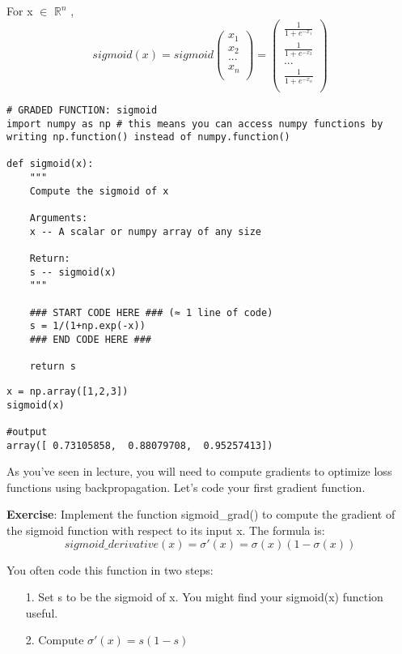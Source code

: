 For x $\in$ $\mathbb{R}^n$ ,
\begin{equation}
sigmoid(x) = sigmoid\begin{pmatrix}
    x_1  \\
    x_2  \\
    ...  \\
    x_n  \\
\end{pmatrix} = \begin{pmatrix}
    \frac{1}{1+e^{-x_1}}  \\
    \frac{1}{1+e^{-x_2}}  \\
    ...  \\
    \frac{1}{1+e^{-x_n}}  \\
\end{pmatrix}
\end{equation}

\begin{verbatim}
# GRADED FUNCTION: sigmoid
import numpy as np # this means you can access numpy functions by writing np.function() instead of numpy.function()

def sigmoid(x):
    """
    Compute the sigmoid of x

    Arguments:
    x -- A scalar or numpy array of any size

    Return:
    s -- sigmoid(x)
    """
    
    ### START CODE HERE ### (≈ 1 line of code)
    s = 1/(1+np.exp(-x))
    ### END CODE HERE ###
    
    return s
\end{verbatim}

\begin{verbatim}
x = np.array([1,2,3])
sigmoid(x)

#output
array([ 0.73105858,  0.88079708,  0.95257413])
\end{verbatim}


As you've seen in lecture, you will need to compute gradients to optimize loss functions using backpropagation. Let's code your first gradient function.

{\textbf {Exercise}}: Implement the function sigmoid\_grad() to compute the gradient of the sigmoid function with respect to its input x. The formula is: 
\begin{equation}
sigmoid\_derivative(x) = \sigma'(x) = \sigma(x) (1 - \sigma(x))
\end{equation}

You often code this function in two steps:
\begin{itemize}
\item[1.] Set s to be the sigmoid of x. You might find your sigmoid(x) function useful.
\item[2.] Compute $\sigma'(x) = s(1-s)$
\end{itemize}


